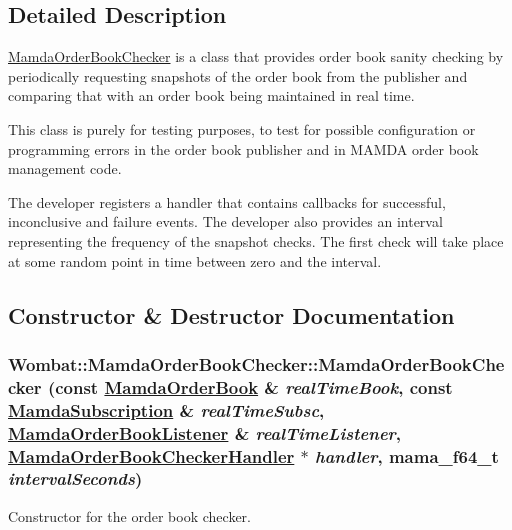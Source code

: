 \subsection{Detailed Description}
\hyperlink{classWombat_1_1MamdaOrderBookChecker}{Mamda\-Order\-Book\-Checker} is a class that provides order book sanity checking by periodically requesting snapshots of the order book from the publisher and comparing that with an order book being maintained in real time. 

This class is purely for testing purposes, to test for possible configuration or programming errors in the order book publisher and in MAMDA order book management code.

The developer registers a handler that contains callbacks for successful, inconclusive and failure events. The developer also provides an interval representing the frequency of the snapshot checks. The first check will take place at some random point in time between zero and the interval. 



\subsection{Constructor \& Destructor Documentation}
\hypertarget{classWombat_1_1MamdaOrderBookChecker_f0427cac9cac0835084c247632702863}{
\subsubsection[MamdaOrderBookChecker]{\setlength{\rightskip}{0pt plus 5cm}Wombat::Mamda\-Order\-Book\-Checker::Mamda\-Order\-Book\-Checker (const \hyperlink{classWombat_1_1MamdaOrderBook}{Mamda\-Order\-Book} \& {\em real\-Time\-Book}, const \hyperlink{classWombat_1_1MamdaSubscription}{Mamda\-Subscription} \& {\em real\-Time\-Subsc}, \hyperlink{classWombat_1_1MamdaOrderBookListener}{Mamda\-Order\-Book\-Listener} \& {\em real\-Time\-Listener}, \hyperlink{classWombat_1_1MamdaOrderBookCheckerHandler}{Mamda\-Order\-Book\-Checker\-Handler} $\ast$ {\em handler}, mama\_\-f64\_\-t {\em interval\-Seconds})}}
\label{classWombat_1_1MamdaOrderBookChecker_f0427cac9cac0835084c247632702863}


Constructor for the order book checker. 

